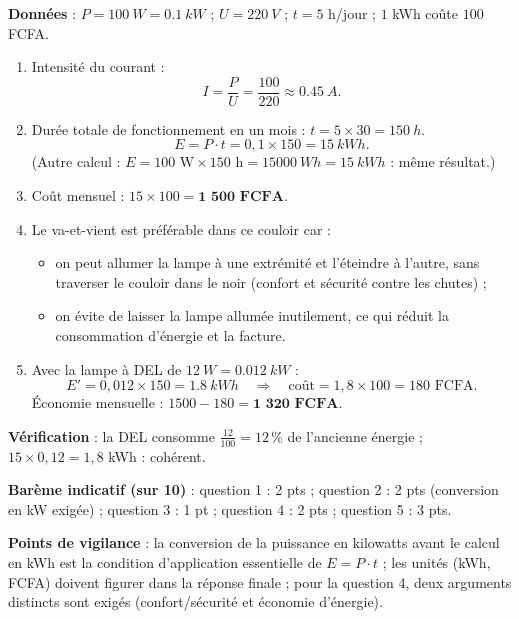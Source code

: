 \documentclass[11pt]{article}
\begin{document}
\begin{corrige}
\textbf{Données} : $P = \SI{100}{W} = \SI{0,1}{kW}$ ; $U = \SI{220}{V}$ ; $t = 5$ h/jour ; $1$ kWh coûte $100$ FCFA.
\begin{enumerate}
\item Intensité du courant :
\[ I = \frac{P}{U} = \frac{100}{220} \approx \SI{0,45}{A}. \]
\item Durée totale de fonctionnement en un mois : $t = 5 \times 30 = \SI{150}{h}$.
\[ E = P \cdot t = 0,1 \times 150 = \SI{15}{kWh}. \]
(Autre calcul : $E = 100 \text{ W} \times 150 \text{ h} = \SI{15000}{Wh} = \SI{15}{kWh}$ : même résultat.)
\item Coût mensuel : $15 \times 100 = \textbf{1 500 FCFA}$.
\item Le va-et-vient est préférable dans ce couloir car :
\begin{itemize}
\item on peut allumer la lampe à une extrémité et l'éteindre à l'autre, sans traverser le couloir dans le noir (confort et sécurité contre les chutes) ;
\item on évite de laisser la lampe allumée inutilement, ce qui réduit la consommation d'énergie et la facture.
\end{itemize}
\item Avec la lampe à DEL de $\SI{12}{W} = \SI{0,012}{kW}$ :
\[ E' = 0,012 \times 150 = \SI{1,8}{kWh} \quad \Rightarrow \quad \text{coût} = 1,8 \times 100 = 180 \text{ FCFA}. \]
Économie mensuelle : $1500 - 180 = \textbf{1 320 FCFA}$.
\end{enumerate}
\textbf{Vérification} : la DEL consomme $\frac{12}{100} = 12\,\%$ de l'ancienne énergie ; $15 \times 0,12 = 1,8$ kWh : cohérent.

\textbf{Barème indicatif (sur 10)} : question 1 : 2 pts ; question 2 : 2 pts (conversion en kW exigée) ; question 3 : 1 pt ; question 4 : 2 pts ; question 5 : 3 pts.

\textbf{Points de vigilance} : la conversion de la puissance en kilowatts avant le calcul en kWh est la condition d'application essentielle de $E = P \cdot t$ ; les unités (kWh, FCFA) doivent figurer dans la réponse finale ; pour la question 4, deux arguments distincts sont exigés (confort/sécurité et économie d'énergie).
\end{corrige}
\end{document}
